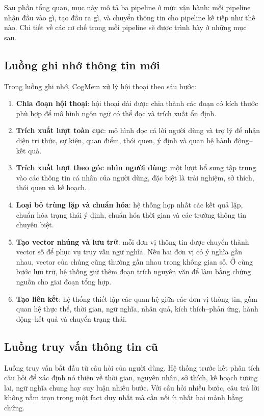 \documentclass[../main.tex]{subfiles}
\begin{document}
Sau phần tổng quan, mục này mô tả ba pipeline ở mức vận hành: mỗi pipeline nhận đầu vào gì, tạo đầu ra gì, và chuyển thông tin cho pipeline kế tiếp như thế nào. Chi tiết về các cơ chế trong mỗi pipeline sẽ được trình bày ở những mục sau.

\subsection{Luồng ghi nhớ thông tin mới}

Trong luồng ghi nhớ, CogMem xử lý hội thoại theo sáu bước:

\begin{enumerate}
    \item \textbf{Chia đoạn hội thoại}: hội thoại dài được chia thành các đoạn có kích thước phù hợp để mô hình ngôn ngữ có thể đọc và trích xuất ổn định.
    \item \textbf{Trích xuất lượt toàn cục}: mô hình đọc cả lời người dùng và trợ lý để nhận diện tri thức, sự kiện, quan điểm, thói quen, ý định và quan hệ hành động--kết quả.
    \item \textbf{Trích xuất lượt theo góc nhìn người dùng}: một lượt bổ sung tập trung vào các thông tin cá nhân của người dùng, đặc biệt là trải nghiệm, sở thích, thói quen và kế hoạch.
    \item \textbf{Loại bỏ trùng lặp và chuẩn hóa}: hệ thống hợp nhất các kết quả lặp, chuẩn hóa trạng thái ý định, chuẩn hóa thời gian và các trường thông tin chuyên biệt.
    \item \textbf{Tạo vector nhúng và lưu trữ}: mỗi đơn vị thông tin được chuyển thành vector số để phục vụ truy vấn ngữ nghĩa. Nếu hai đơn vị có ý nghĩa gần nhau, vector của chúng cũng thường gần nhau trong không gian số. Ở cùng bước lưu trữ, hệ thống giữ thêm đoạn trích nguyên văn để làm bằng chứng nguồn cho giai đoạn tổng hợp.
    \item \textbf{Tạo liên kết}: hệ thống thiết lập các quan hệ giữa các đơn vị thông tin, gồm quan hệ thực thể, thời gian, ngữ nghĩa, nhân quả, kích thích--phản ứng, hành động--kết quả và chuyển trạng thái.
\end{enumerate}

\subsection{Luồng truy vấn thông tin cũ}

Luồng truy vấn bắt đầu từ câu hỏi của người dùng. Hệ thống trước hết phân tích câu hỏi để xác định nó thiên về thời gian, nguyên nhân, sở thích, kế hoạch tương lai, ngữ nghĩa chung hay suy luận nhiều bước. Với câu hỏi nhiều bước, câu trả lời không nằm trọn trong một fact duy nhất mà cần nối ít nhất hai mảnh bằng chứng.
\end{document}
